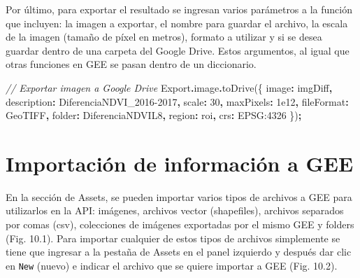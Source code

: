 \documentclass[
  12pt,
  letterpaper,
  twoside]{book}
\newenvironment{Shaded}{\begin{snugshade}}{\end{snugshade}}
\newcommand{\AttributeTok}[1]{\textcolor[rgb]{0.77,0.63,0.00}{#1}}
\newcommand{\CommentTok}[1]{\textcolor[rgb]{0.56,0.35,0.01}{\textit{#1}}}
\newcommand{\DataTypeTok}[1]{\textcolor[rgb]{0.13,0.29,0.53}{#1}}
\newcommand{\DecValTok}[1]{\textcolor[rgb]{0.00,0.00,0.81}{#1}}
\newcommand{\FloatTok}[1]{\textcolor[rgb]{0.00,0.00,0.81}{#1}}
\newcommand{\FunctionTok}[1]{\textcolor[rgb]{0.00,0.00,0.00}{#1}}
\newcommand{\NormalTok}[1]{#1}
\newcommand{\OperatorTok}[1]{\textcolor[rgb]{0.81,0.36,0.00}{\textbf{#1}}}
\newcommand{\StringTok}[1]{\textcolor[rgb]{0.31,0.60,0.02}{#1}}
\begin{document}
Por último, para exportar el resultado se ingresan varios parámetros a la función que incluyen: la imagen a exportar, el nombre para guardar el archivo, la escala de la imagen (tamaño de píxel en metros), formato a utilizar y si se desea guardar dentro de una carpeta del Google Drive. Estos argumentos, al igual que otras funciones en GEE se pasan dentro de un diccionario.

\begin{Shaded}
\begin{Highlighting}[]
\CommentTok{// Exportar imagen a Google Drive}
\NormalTok{Export}\OperatorTok{.}\AttributeTok{image}\OperatorTok{.}\FunctionTok{toDrive}\NormalTok{(\{}
  \DataTypeTok{image}\OperatorTok{:}\NormalTok{ imgDiff}\OperatorTok{,}
  \DataTypeTok{description}\OperatorTok{:} \StringTok{\textquotesingle{}DiferenciaNDVI\_2016{-}2017\textquotesingle{}}\OperatorTok{,}
  \DataTypeTok{scale}\OperatorTok{:} \DecValTok{30}\OperatorTok{,}
  \DataTypeTok{maxPixels}\OperatorTok{:} \FloatTok{1e12}\OperatorTok{,}
  \DataTypeTok{fileFormat}\OperatorTok{:} \StringTok{\textquotesingle{}GeoTIFF\textquotesingle{}}\OperatorTok{,}
  \DataTypeTok{folder}\OperatorTok{:} \StringTok{\textquotesingle{}DiferenciaNDVIL8\textquotesingle{}}\OperatorTok{,}
  \DataTypeTok{region}\OperatorTok{:}\NormalTok{ roi}\OperatorTok{,}
  \DataTypeTok{crs}\OperatorTok{:} \StringTok{\textquotesingle{}EPSG:4326}
\NormalTok{\})}\OperatorTok{;} 
\end{Highlighting}
\end{Shaded}

\newpage

\hypertarget{importaciuxf3n-de-informaciuxf3n-a-gee}{%
\chapter{Importación de información a GEE}\label{importaciuxf3n-de-informaciuxf3n-a-gee}}

En la sección de Assets, se pueden importar varios tipos de archivos a GEE para utilizarlos en la API: imágenes, archivos vector (shapefiles), archivos separados por comas (csv), colecciones de imágenes exportadas por el mismo GEE y folders (Fig. 10.1). Para importar cualquier de estos tipos de archivos simplemente se tiene que ingresar a la pestaña de Assets en el panel izquierdo y después dar clic en \texttt{New} (nuevo) e indicar el archivo que se quiere importar a GEE (Fig. 10.2).
\end{document}

